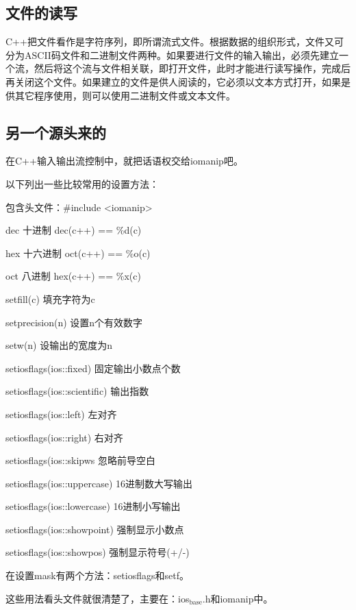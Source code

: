\documentclass{article}
\begin{document}
\subsection{文件的读写}
\label{sec-10-7}

C++把文件看作是字符序列，即所谓流式文件。根据数据的组织形式，文件又可分为ASCII码文件和二进制文件两种。如果要进行文件的输入输出，必须先建立一个流，然后将这个流与文件相关联，即打开文件，此时才能进行读写操作，完成后再关闭这个文件。如果建立的文件是供人阅读的，它必须以文本方式打开，如果是供其它程序使用，则可以使用二进制文件或文本文件。 
\subsection{另一个源头来的}
\label{sec-10-8}

在C++输入输出流控制中，就把话语权交给iomanip吧。

以下列出一些比较常用的设置方法：

包含头文件：\#include <iomanip>

dec 十进制    dec(c++) == \%d(c)

hex 十六进制  oct(c++) == \%o(c)

oct 八进制    hex(c++) == \%x(c)

setfill(c) 填充字符为c

setprecision(n) 设置n个有效数字

setw(n) 设输出的宽度为n

setiosflags(ios::fixed) 固定输出小数点个数

setiosflags(ios::scientific) 输出指数

setiosflags(ios::left) 左对齐

setiosflags(ios::right) 右对齐

setiosflags(ios::skipws 忽略前导空白

setiosflags(ios::uppercase) 16进制数大写输出

setiosflags(ios::lowercase) 16进制小写输出

setiosflags(ios::showpoint) 强制显示小数点

setiosflags(ios::showpos) 强制显示符号(+/-)

在设置mask有两个方法：setiosflags和setf。

这些用法看头文件就很清楚了，主要在：ios$_{\text{base}}$.h和iomanip中。
\end{document}
